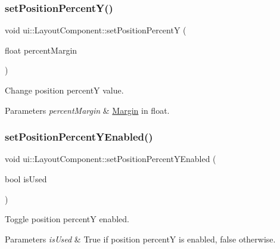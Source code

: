 \subsubsection{\texorpdfstring{set\+Position\+Percent\+Y()}{setPositionPercentY()}\hspace{0.1cm}{\footnotesize\ttfamily [2/2]}}
{\footnotesize\ttfamily void ui\+::\+Layout\+Component\+::set\+Position\+PercentY (\begin{DoxyParamCaption}\item[{float}]{percent\+Margin }\end{DoxyParamCaption})}

Change position percentY value. 
\begin{DoxyParams}{Parameters}
{\em percent\+Margin} & \hyperlink{classui_1_1Margin}{Margin} in float. \\
\hline
\end{DoxyParams}
\mbox{\label{classui_1_1LayoutComponent_a820438ea0ef37dd3570ef21d9a3392ab}} 
\subsubsection{\texorpdfstring{set\+Position\+Percent\+Y\+Enabled()}{setPositionPercentYEnabled()}\hspace{0.1cm}{\footnotesize\ttfamily [1/2]}}
{\footnotesize\ttfamily void ui\+::\+Layout\+Component\+::set\+Position\+Percent\+Y\+Enabled (\begin{DoxyParamCaption}\item[{bool}]{is\+Used }\end{DoxyParamCaption})}

Toggle position percentY enabled. 
\begin{DoxyParams}{Parameters}
{\em is\+Used} & True if position percentY is enabled, false otherwise. \\
\hline
\end{DoxyParams}
\mbox{\label{classui_1_1LayoutComponent_a820438ea0ef37dd3570ef21d9a3392ab}} 
